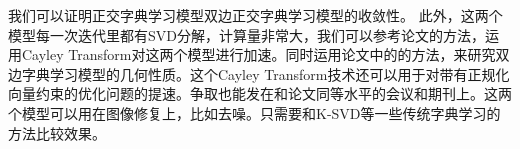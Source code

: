 \documentclass[10pt,twocolumn,letterpaper]{article}
\begin{document}
我们可以证明正交字典学习模型双边正交字典学习模型的收敛性。
此外，这两个模型每一次迭代里都有SVD分解，计算量非常大，我们可以参考论文\cite{wen2013feasible}的方法，运用Cayley Transform对这两个模型进行加速。同时运用论文中的\cite{edelman1998geometry}的方法，来研究双边字典学习模型的几何性质。这个Cayley Transform技术还可以用于对带有正规化向量约束的优化问题的提速。争取也能发在和论文\cite{bao2014convergent,bao2014l0,bao2016dictionary}同等水平的会议和期刊上。这两个模型可以用在图像修复上，比如去噪。只需要和K-SVD等一些传统字典学习的方法比较效果。





{
\small


}
\end{document}
